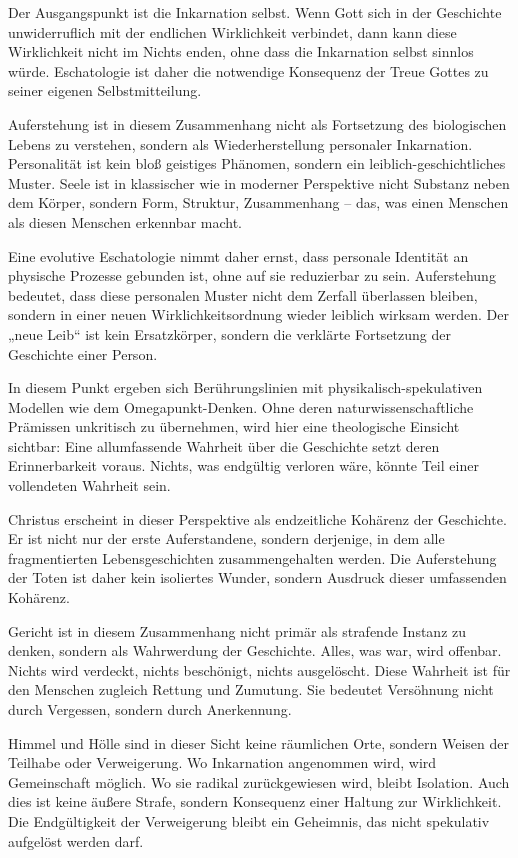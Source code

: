 \documentclass[
  ngerman,
]{article}
\begin{document}
Der Ausgangspunkt ist die Inkarnation selbst. Wenn Gott sich in der
Geschichte unwiderruflich mit der endlichen Wirklichkeit verbindet, dann
kann diese Wirklichkeit nicht im Nichts enden, ohne dass die Inkarnation
selbst sinnlos würde. Eschatologie ist daher die notwendige Konsequenz
der Treue Gottes zu seiner eigenen Selbstmitteilung.

Auferstehung ist in diesem Zusammenhang nicht als Fortsetzung des
biologischen Lebens zu verstehen, sondern als Wiederherstellung
personaler Inkarnation. Personalität ist kein bloß geistiges Phänomen,
sondern ein leiblich-geschichtliches Muster. Seele ist in klassischer
wie in moderner Perspektive nicht Substanz neben dem Körper, sondern
Form, Struktur, Zusammenhang -- das, was einen Menschen als diesen
Menschen erkennbar macht.

Eine evolutive Eschatologie nimmt daher ernst, dass personale Identität
an physische Prozesse gebunden ist, ohne auf sie reduzierbar zu sein.
Auferstehung bedeutet, dass diese personalen Muster nicht dem Zerfall
überlassen bleiben, sondern in einer neuen Wirklichkeitsordnung wieder
leiblich wirksam werden. Der „neue Leib`` ist kein Ersatzkörper, sondern
die verklärte Fortsetzung der Geschichte einer Person.

In diesem Punkt ergeben sich Berührungslinien mit
physikalisch-spekulativen Modellen wie dem Omegapunkt-Denken. Ohne deren
naturwissenschaftliche Prämissen unkritisch zu übernehmen, wird hier
eine theologische Einsicht sichtbar: Eine allumfassende Wahrheit über
die Geschichte setzt deren Erinnerbarkeit voraus. Nichts, was endgültig
verloren wäre, könnte Teil einer vollendeten Wahrheit sein.

Christus erscheint in dieser Perspektive als endzeitliche Kohärenz der
Geschichte. Er ist nicht nur der erste Auferstandene, sondern derjenige,
in dem alle fragmentierten Lebensgeschichten zusammengehalten werden.
Die Auferstehung der Toten ist daher kein isoliertes Wunder, sondern
Ausdruck dieser umfassenden Kohärenz.

Gericht ist in diesem Zusammenhang nicht primär als strafende Instanz zu
denken, sondern als Wahrwerdung der Geschichte. Alles, was war, wird
offenbar. Nichts wird verdeckt, nichts beschönigt, nichts ausgelöscht.
Diese Wahrheit ist für den Menschen zugleich Rettung und Zumutung. Sie
bedeutet Versöhnung nicht durch Vergessen, sondern durch Anerkennung.

Himmel und Hölle sind in dieser Sicht keine räumlichen Orte, sondern
Weisen der Teilhabe oder Verweigerung. Wo Inkarnation angenommen wird,
wird Gemeinschaft möglich. Wo sie radikal zurückgewiesen wird, bleibt
Isolation. Auch dies ist keine äußere Strafe, sondern Konsequenz einer
Haltung zur Wirklichkeit. Die Endgültigkeit der Verweigerung bleibt ein
Geheimnis, das nicht spekulativ aufgelöst werden darf.
\end{document}
